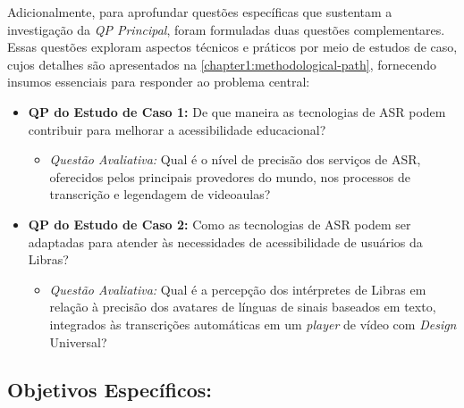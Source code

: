 Adicionalmente, para aprofundar questões específicas que sustentam a investigação da \textit{QP Principal}, foram formuladas duas questões complementares. Essas questões exploram aspectos técnicos e práticos por meio de estudos de caso, cujos detalhes são apresentados na \autoref{chapter1:methodological-path}, fornecendo insumos essenciais para responder ao problema central:

\begin{itemize}
    \item \textbf{QP do Estudo de Caso 1:} De que maneira as tecnologias de ASR podem contribuir para melhorar a acessibilidade educacional?
    \begin{itemize}
        \item \textit{Questão Avaliativa:} Qual é o nível de precisão dos serviços de ASR, oferecidos pelos principais provedores do mundo, nos processos de transcrição e legendagem de videoaulas?
    \end{itemize}
    
    \item \textbf{QP do Estudo de Caso 2:} Como as tecnologias de ASR podem ser adaptadas para atender às necessidades de acessibilidade de usuários da Libras?
    \begin{itemize}
        \item \textit{Questão Avaliativa:} Qual é a percepção dos intérpretes de Libras em relação à precisão dos avatares de línguas de sinais baseados em texto, integrados às transcrições automáticas em um \textit{player} de vídeo com \textit{Design} Universal?
    \end{itemize}
\end{itemize}

\subsection*{Objetivos Específicos:}

